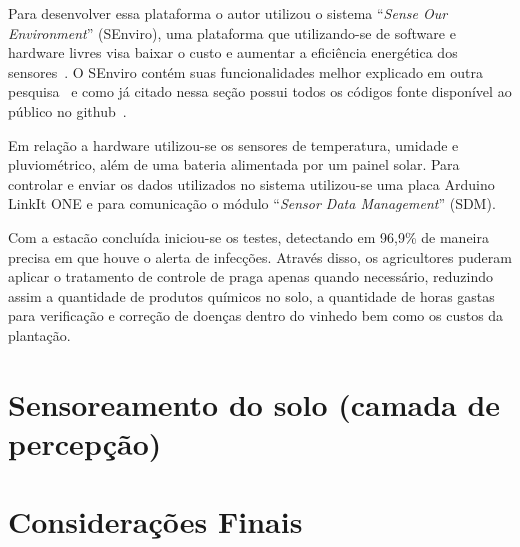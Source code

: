\documentclass[
	article,			%
	12pt,				%
	oneside,			%
	a4paper,			%
	english,			%
	brazil,				%
	sumario=tradicional
	]{abntex2}
\begin{document}
Para desenvolver essa plataforma o autor utilizou o sistema ``\textit{Sense Our Environment}'' (SEnviro), uma plataforma que utilizando-se de software e hardware livres visa baixar o custo e aumentar a eficiência energética dos sensores~\cite{2}. O SEnviro contém suas funcionalidades melhor explicado em outra pesquisa~\cite{SEnviro} e como já citado nessa seção possui todos os códigos fonte disponível ao público no github~\cite{SEnviro_Github}.

Em relação a hardware utilizou-se os sensores de temperatura, umidade e pluviométrico, além de uma bateria alimentada por um painel solar. Para controlar e enviar os dados utilizados no sistema utilizou-se uma placa Arduino LinkIt ONE e para comunicação o módulo ``\textit{Sensor Data Management}'' (SDM).

Com a estacão concluída iniciou-se os testes, detectando em 96,9\% de maneira precisa em que houve o alerta de infecções. Através disso, os agricultores puderam aplicar o tratamento de controle de praga apenas quando necessário, reduzindo assim a quantidade de produtos químicos no solo, a quantidade de horas gastas para verificação e correção de doenças dentro do vinhedo bem como os custos da plantação.

\section{Sensoreamento do solo (camada de percepção)}\label{Sensoreamento do solo (camada de percepção)}

\section{Considerações Finais}
\postextual

\cleardoublepage


%
%
\end{document}
